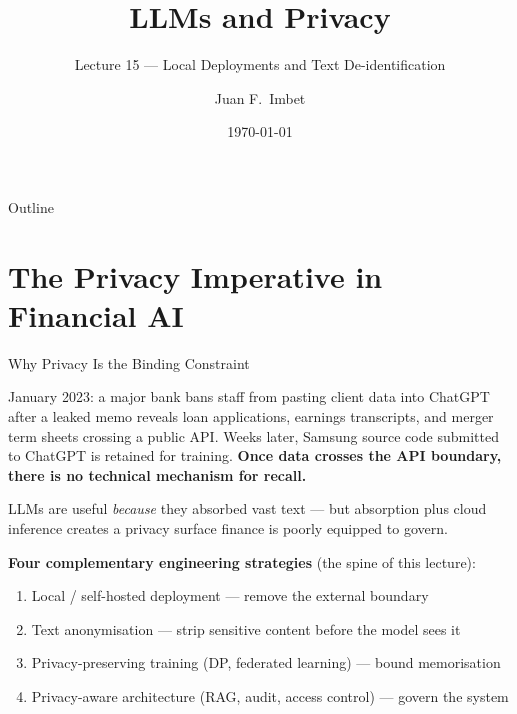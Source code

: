 \documentclass[9pt,t]{beamer}
\title{LLMs and Privacy}
\subtitle{Lecture 15 --- Local Deployments and Text De-identification}
\author{Juan F.\ Imbet}
\institute{Paris Dauphine -- PSL University}
\date{\today}
\begin{document}
\begin{frame}\titlepage\end{frame}

\begin{frame}{Outline}\tableofcontents\end{frame}

\section{The Privacy Imperative in Financial AI}

\begin{frame}{Why Privacy Is the Binding Constraint}
\begin{bigpicture}
January 2023: a major bank bans staff from pasting client data into ChatGPT after
a leaked memo reveals loan applications, earnings transcripts, and merger term
sheets crossing a public API. Weeks later, Samsung source code submitted to
ChatGPT is retained for training. \textbf{Once data crosses the API boundary,
there is no technical mechanism for recall.}
\end{bigpicture}

\smallskip
LLMs are useful \emph{because} they absorbed vast text --- but absorption plus cloud
inference creates a privacy surface finance is poorly equipped to govern.

\smallskip
\textbf{Four complementary engineering strategies} (the spine of this lecture):
\begin{enumerate}
  \item Local / self-hosted deployment --- remove the external boundary
  \item Text anonymisation --- strip sensitive content before the model sees it
  \item Privacy-preserving training (DP, federated learning) --- bound memorisation
  \item Privacy-aware architecture (RAG, audit, access control) --- govern the system
\end{enumerate}
\end{frame}
\end{document}
